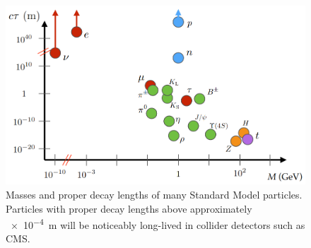 \begin{figure}[hbtp]
\centering
\includegraphics[scale=0.4]{figures/intro/sm_llps.png}
\caption{Masses and proper decay lengths of many Standard Model particles. Particles with proper decay lengths above approximately \SI{e-4}{\m} will be noticeably long-lived in collider detectors such as CMS.}
\label{sm_llps}
\end{figure}